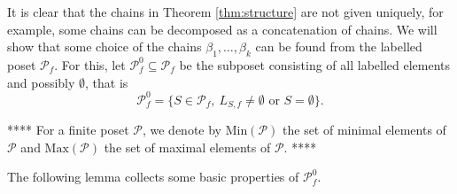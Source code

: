 \documentclass[12pt]{article}
\theoremstyle{definition}
\theoremstyle{remark}
\def\Te{\mathcal T}
\def\Pe{\mathcal P}
\begin{document}
%
%
%
%
%
%



It is clear that the chains in Theorem \ref{thm:structure} are not given uniquely, for
example, some chains can be decomposed as a  concatenation of chains.
We will show that some choice of the chains $\beta_1,\dots,\beta_k$  can be found from the
labelled poset  $\Pe_f$. For this, let $\Pe_f^0\subseteq \Pe_f$ be the subposet consisting
of  all  labelled elements and possibly $\emptyset$, that is
\[
\Pe_f^0=\{S\in \Pe_f, \ L_{S,f}\ne \emptyset \text{ or } S=\emptyset\}.
\]

****
For a finite poset $\Pe$, we denote by $\mathrm{Min}(\Pe)$ the set of minimal elements of
$\Pe$ and $\mathrm{Max}(\Pe)$ the set of maximal elements of $\Pe$.
****

The following lemma collects some basic properties of $\Pe_f^0$.
\end{document}
